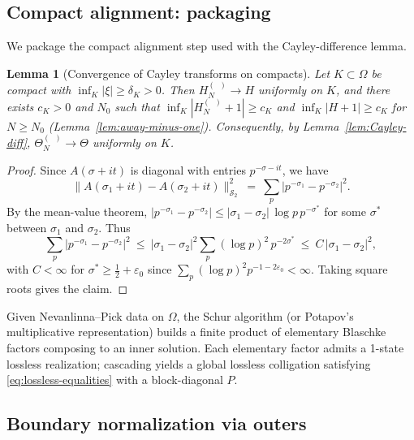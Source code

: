 \documentclass[11pt]{article}
\newtheorem{lemma}[theorem]{Lemma}
\theoremstyle{remark}
\newcommand{\HS}{\mathcal{S}_2}
\DeclareMathOperator{\dettwo}{det_2}
\begin{document}
\subsection{Compact alignment: packaging}\label{app:compact-alignment}
We package the compact alignment step used with the Cayley-difference lemma.

\begin{lemma}[Convergence of Cayley transforms on compacts]\label{lem:compact-alignment}
Let $K\subset\Omega$ be compact with $\inf_{K}|\xi|\ge\delta_K>0$. Then $H_N^{(\dettwo)}\to H$ uniformly on $K$, and there exists $c_K>0$ and $N_0$ such that $\inf_{K}|H_N^{(\dettwo)}+1|\ge c_K$ and $\inf_{K}|H+1|\ge c_K$ for $N\ge N_0$ (Lemma~\ref{lem:away-minus-one}). Consequently, by Lemma~\ref{lem:Cayley-diff}, $\Theta_N^{(\dettwo)}\to \Theta$ uniformly on $K$.
\end{lemma}
\begin{proof}
Since $A(\sigma+it)$ is diagonal with entries $p^{-\sigma-it}$, we have
\[
 \|A(\sigma_1+it)-A(\sigma_2+it)\|_{\HS}^2\ =\ \sum_{p}\bigl|p^{-\sigma_1}-p^{-\sigma_2}\bigr|^2.
\]
By the mean-value theorem, $|p^{-\sigma_1}-p^{-\sigma_2}|\le |\sigma_1-\sigma_2|\,\log p\,p^{-\sigma^*}$ for some $\sigma^*$ between $\sigma_1$ and $\sigma_2$. Thus
\[
 \sum_{p}\bigl|p^{-\sigma_1}-p^{-\sigma_2}\bigr|^2\ \le\ |\sigma_1-\sigma_2|^2\sum_{p}(\log p)^2\,p^{-2\sigma^*}\ \le\ C\,|\sigma_1-\sigma_2|^2,
\]
with $C<\infty$ for $\sigma^*\ge \tfrac12+\varepsilon_0$ since $\sum_p (\log p)^2 p^{-1-2\varepsilon_0}<\infty$. Taking square roots gives the claim.
\end{proof}
Given Nevanlinna--Pick data on \(\Omega\), the Schur algorithm (or Potapov's multiplicative representation) builds a finite product of elementary Blaschke factors composing to an inner solution. Each elementary factor admits a 1-state lossless realization; cascading yields a global lossless colligation satisfying \eqref{eq:lossless-equalities} with a block-diagonal \(P\).

\subsection{Boundary normalization via outers}\label{app:p1-proof}
\end{document}
